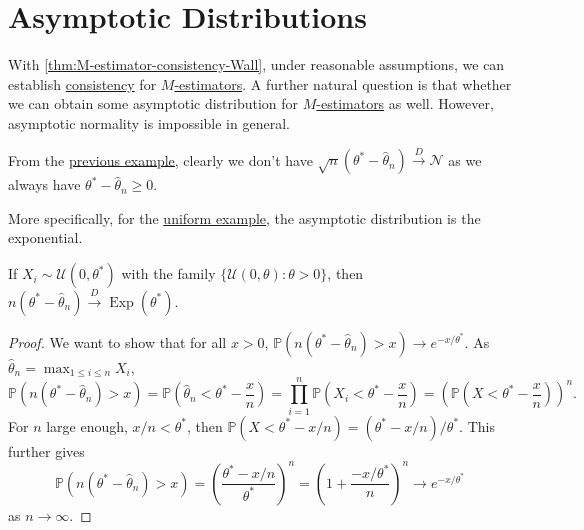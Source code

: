 \section{Asymptotic Distributions}
With \autoref{thm:M-estimator-consistency-Wall}, under reasonable assumptions, we can establish \hyperref[def:consistent]{consistency} for \hyperref[def:M-estimator]{\(M\)-estimators}. A further natural question is that whether we can obtain some asymptotic distribution for \hyperref[def:M-estimator]{\(M\)-estimators} as well. However, asymptotic normality is impossible in general.

\begin{eg}
	From the \hyperref[eg:uniform-MLE]{previous example}, clearly we don't have \(\sqrt{n} (\theta^{\ast} - \hat{\theta} _n) \overset{D}{\to} \mathcal{N} \) as we always have \(\theta ^{\ast} - \hat{\theta} _n \geq 0\).
\end{eg}

More specifically, for the \hyperref[eg:uniform-MLE]{uniform example}, the asymptotic distribution is the exponential.

\begin{proposition}\label{prop:uniform-MLE-asymptotic-distribution}
	If \(X_i \sim \mathcal{U} (0, \theta ^{\ast} )\) with the family \(\{\mathcal{U} (0, \theta ) \colon \theta > 0 \} \), then \(n (\theta ^{\ast} - \hat{\theta} _n) \overset{D}{\to} \operatorname{Exp}(\theta ^{\ast} )\).
\end{proposition}
\begin{proof}
	We want to show that for all \(x > 0\), \(\mathbb{P} (n(\theta ^{\ast} - \hat{\theta} _n) > x) \to e^{- x / \theta ^{\ast} }\). As \(\hat{\theta} _n = \max _{1 \leq i \leq n} X_i\),
	\[
		\mathbb{P} (n(\theta ^{\ast} - \hat{\theta} _n) > x)
		= \mathbb{P} \left( \hat{\theta} _n <\theta ^{\ast} - \frac{x}{n} \right)
		= \prod_{i=1}^{n} \mathbb{P} \left( X_i < \theta ^{\ast} - \frac{x}{n} \right)
		= \left( \mathbb{P} \left( X < \theta ^{\ast} - \frac{x}{n} \right) \right) ^n.
	\]
	For \(n\) large enough, \(x / n < \theta ^{\ast} \), then \(\mathbb{P} (X < \theta ^{\ast} - x / n) = (\theta ^{\ast} - x / n) / \theta ^{\ast} \). This further gives
	\[
		\mathbb{P} (n(\theta ^{\ast} - \hat{\theta} _n) > x)
		= \left( \frac{\theta ^{\ast} - x / n}{\theta ^{\ast} } \right) ^n
		= \left( 1 + \frac{- x / \theta ^{\ast} }{n} \right) ^n
		\to e^{- x / \theta ^{\ast} }
	\]
	as \(n \to \infty \).
\end{proof}

